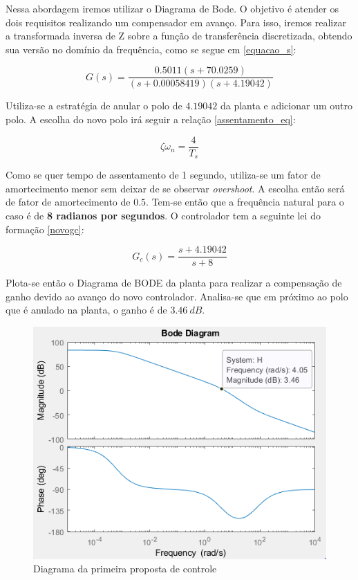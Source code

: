 \documentclass[a4paper,11pt]{article}
\begin{document}
Nessa abordagem iremos utilizar o Diagrama de Bode. O objetivo é atender os dois requisitos realizando um compensador em avanço. Para isso, iremos realizar a transformada inversa de Z sobre a função de transferência discretizada, obtendo sua versão no domínio da frequência, como se segue em \ref{equacao_s}:

\begin{equation}
G(s) = \frac{0.5011(s+70.0259)}{(s+0.00058419)(s+4.19042)}
\label{equacao_s}
\end{equation}

Utiliza-se a estratégia de anular o polo de $4.19042$ da planta e adicionar um outro polo. A escolha do novo polo irá seguir a relação \ref{assentamento_eq}:

\begin{equation}
\zeta \omega_{n}=\frac{4}{T_{s}}
\label{assentamento_eq}
\end{equation}



Como se quer tempo de assentamento de 1 segundo, utiliza-se um fator de amortecimento menor sem deixar de se observar \textit{overshoot}. A escolha então será de fator de amortecimento de $0.5$. Tem-se então que a frequência natural para o caso é de \textbf{8 radianos por segundos}. O controlador tem a seguinte lei do formação \ref{novogc}:

\begin{equation}
G_{c}(s)=\frac{s+4.19042}{s+8}
\label{novogc}
\end{equation}

Plota-se então o Diagrama de BODE da planta para realizar a compensação de ganho devido ao avanço do novo controlador. Analisa-se que em próximo ao polo que é anulado na planta, o ganho é de $3.46\ dB$.

\begin{figure}[H]
    \centering
    \includegraphics[width=\linewidth]{src/tex/img/bode.PNG}
    \caption{Diagrama da primeira proposta de controle}
    \label{fig:lgr}
\end{figure}
\end{document}
